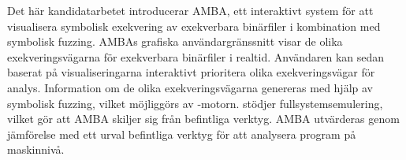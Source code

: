 Det här kandidatarbetet introducerar AMBA, ett interaktivt system för att visualisera symbolisk exekvering av exekverbara binärfiler i kombination med symbolisk fuzzing.
AMBAs grafiska användargränssnitt visar de olika exekveringsvägarna för exekverbara binärfiler i realtid.
Användaren kan sedan baserat på visualiseringarna interaktivt prioritera olika exekveringsvägar för analys.
Information om de olika exekveringsvägarna genereras med hjälp av symbolisk fuzzing, vilket möjliggörs av \stoe{}-motorn.
\stoe{} stödjer fullsystemsemulering, vilket gör att AMBA skiljer sig från befintliga verktyg.
AMBA utvärderas genom jämförelse med ett urval befintliga verktyg för att analysera program på maskinnivå.
